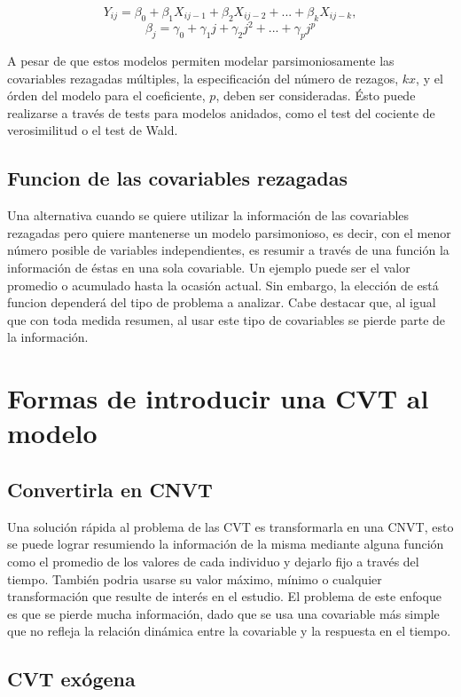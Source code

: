 \documentclass[spanish]{article}
\numberwithin{figure}{subsection}
\numberwithin{equation}{subsection}
\numberwithin{table}{subsection}
\begin{document}
\[ Y_{ij} = \beta_0 + \beta_1 X_{ij-1} + \beta_2 X_{ij-2} + ... +
\beta_k X_{ij-k}, \]
\[ \beta_j = \gamma_0 + \gamma_1 j + \gamma_2 j^2 + ... + \gamma_p j^p \]

A pesar de que estos modelos permiten modelar parsimoniosamente las covariables
rezagadas múltiples, la especificación del número de rezagos, $kx$, y el órden
del modelo para el coeficiente, $p$, deben ser consideradas. Ésto puede
realizarse a través de tests para modelos anidados, como el test del cociente de
verosimilitud o el test de Wald.

\subsection{Funcion de las covariables rezagadas}

Una alternativa cuando se quiere utilizar la información de las covariables
rezagadas pero quiere mantenerse un modelo parsimonioso, es decir, con el menor
número posible de variables independientes, es resumir a través de una función
la información de éstas en una sola covariable. Un ejemplo puede ser el valor
promedio o acumulado hasta la ocasión actual. Sin embargo, la elección de está
funcion dependerá del tipo de problema a analizar. Cabe destacar que, al igual
que con toda medida resumen, al usar este tipo de covariables se pierde
parte de la información.

\section{Formas de introducir una CVT al modelo}

\subsection{Convertirla en CNVT}

Una solución rápida al problema de las CVT es transformarla en una CNVT, esto
se puede lograr resumiendo la información de la misma mediante alguna función
como el promedio de los valores de cada individuo y dejarlo fijo a través del
tiempo. También podria usarse su valor máximo, mínimo o cualquier
transformación que resulte de interés en el estudio. El problema de este
enfoque es que se pierde mucha información, dado que se usa una covariable más
simple que no refleja la relación dinámica entre la covariable y la respuesta
en el tiempo.

\subsection{CVT exógena}
\end{document}
